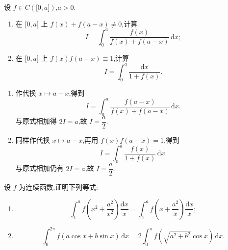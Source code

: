 \begin{example}
    设 $f\in C(\lbrack 0,a\rbrack)$,$a>0$.
    \begin{enumerate}
        \item 在 $\lbrack 0,a\rbrack$ 上 $f(x)+f(a-x)\neq0$,计算
              \[
                  I=\int_0^a\dfrac{f(x)}{f(x)+f(a-x)}\,\mathrm{d}x;
              \]
        \item 在 $\lbrack 0,a\rbrack$ 上 $f(x)f(a-x)\equiv1$,计算
              \[
                  I=\int_0^a\dfrac{\mathrm{d}x}{1+f(x)}.
              \]
    \end{enumerate}
\end{example}
\exampleblank

\begin{solution}
    \leavevmode
    \begin{enumerate}
        \item 作代换 $x\mapsto a-x$,得到
              \[
                  I=\int_0^a\dfrac{f(a-x)}{f(x)+f(a-x)}\,\mathrm{d}x.
              \]
              与原式相加得 $2I=a$,故 $I=\boxed{\dfrac{a}{2}}$.

        \item 同样作代换 $x\mapsto a-x$,再用 $f(x)f(a-x)=1$,得到
              \[
                  I=\int_0^a\dfrac{f(x)}{1+f(x)}\,\mathrm{d}x.
              \]
              与原式相加仍有 $2I=a$,故 $I=\boxed{\dfrac{a}{2}}$.
    \end{enumerate}
\end{solution}

\begin{example}
    设 $f$ 为连续函数,证明下列等式:
    \begin{enumerate}
        \item
              \[
                  \displaystyle\int_1^a f\left(x^2+\dfrac{a^2}{x^2}\right)\dfrac{\mathrm{d}x}{x}
                  =\int_1^a f\left(x+\dfrac{a^2}{x}\right)\dfrac{\mathrm{d}x}{x};
              \]
        \item
              \[
                  \displaystyle\int_0^{2\pi}f(a\cos x+b\sin x)\,\mathrm{d}x
                  =2\int_0^\pi f\left(\sqrt{a^2+b^2}\cos x\right)\,\mathrm{d}x.
              \]
    \end{enumerate}
\end{example}
\exampleblank

